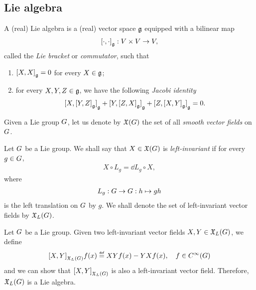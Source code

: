 \subsection{Lie algebra}

\begin{definition}
    A (real) Lie algebra is a (real) vector space $\LieAlgebra$
    equipped with a bilinear map
    \begin{align*}
        \LieBracket \dummy \dummy : \VectorSpace \times \VectorSpace \to \VectorSpace,
    \end{align*}
    called the \emph{Lie bracket} or \emph{commutator},
    such that
    \begin{enumerate}
        \item $\LieBracket X X = 0$ for every $X \in \LieAlgebra$;
        \item for every $X, Y, Z \in \LieAlgebra$, we have the following \emph{Jacobi identity}
            \begin{align*}
                \LieBracket X {\LieBracket Y Z} +
                \LieBracket Y {\LieBracket Z X} +
                \LieBracket Z {\LieBracket X Y}
                = 0.
            \end{align*}
    \end{enumerate}
\end{definition}

Given a Lie group $\Group$,
let us denote by $\VectorFields$ the set of all \emph{smooth vector fields} on $\Group$.

\begin{definition}
    Let $\Group$ be a Lie group.
    We shall say that $X \in \VectorFields$ is \emph{left-invariant}
    if for every $g \in \Group$,
    \begin{align*}
        X \circ L_g = \dd L_g \circ X,
    \end{align*}
    where
    \begin{align}
        L_g : \Group \to \Group : h \mapsto g h
        \label{eq:left_translation_on_Lie_group}
    \end{align}
    is the left translation on $\Group$ by $g$.
    We shall denote the set of left-invariant vector fields by $\LeftInvariantVectorFields$.
\end{definition}

\begin{example}
\label{example:Lie_algebra_of_left-invariant_vector_fields}
    Let $\Group$ be a Lie group.
    Given two left-invariant vector fields $X, Y \in \LeftInvariantVectorFields$,
    we define
    \begin{align*}
        \LieBracket [\LeftInvariantVectorFields] X Y f(x) \defeq X Y f(x) - Y X f(x),
        \quad f \in \SmoothFunctions \Group
    \end{align*}
    and we can show that $\LieBracket [\LeftInvariantVectorFields] X Y$ is also a left-invariant vector field.
    Therefore, $\LeftInvariantVectorFields$ is a Lie algebra.
\end{example}

